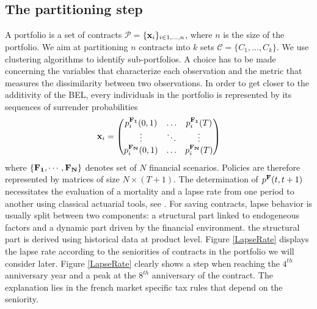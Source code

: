 \subsection{The partitioning step}
A portfolio is a set of contracts $\mathcal{P}=$$\{\bold{x}_{i}\}_{i\in{1,...,n}}$, where $n$ is the size of the portfolio. We aim at partitioning $n$ contracts into $k$ sets $\mathcal{C}$$=\{C_{1},...,C_{k}\}$. We use clustering algorithms to identify sub-portfolios. A choice has to be made concerning the variables that characterize each observation and the metric that measures the dissimilarity between two observations. In order to get closer to the additivity of the BEL, every individuals in the portfolio is represented by its sequences of surrender probabilities 
\begin{equation}\label{SurrenderingProbabilityMatrixFinancial}
\bold{x}_{i}=\begin{pmatrix}
p_{i}^{\bold{F_{1}}}(0,1)&\ldots&p_{i}^{\bold{F_{1}}}(T)\\
\vdots&\ddots&\vdots\\
p_{i}^{\bold{F_{N}}}(0,1)&\ldots&p_{i}^{\bold{F_{N}}}(T)
 \end{pmatrix}
\end{equation} 
where $\{\bold{F_{1}},\cdots,\bold{F_{N}}\}$ denotes set of $N$ financial scenarios. Policies are therefore represented by matrices of size $N\times (T+1)$. The determination of $p^{\bold{F}}(t,t+1)$ necessitates the evaluation of a mortality and a lapse rate from one period to another using classical actuarial tools, see \citet{PeKeBe02}. For saving contracts, lapse behavior is usually split between two components: a structural part linked to endogeneous factors and a dynamic part driven by the financial environment. the structural part is derived using historical data at product level. Figure \ref{LapseRate} displays the lapse rate according to the seniorities of contracts in the portfolio we will consider later. Figure \ref{LapseRate} clearly shows a step when reaching the $4^{th}$ anniversary year and a peak at the $8^{th}$ anniversary of the contract. The explanation lies in the french market specific tax rules that depend on the seniority. 
